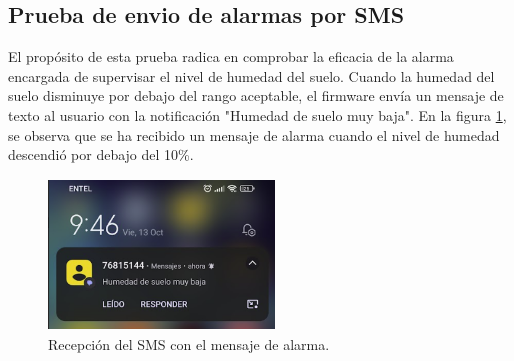 \subsection{Prueba de envio de alarmas por SMS}
El propósito de esta prueba radica en comprobar la eficacia de la alarma encargada de supervisar el nivel de humedad del suelo. Cuando la humedad del suelo disminuye por debajo del rango aceptable, el firmware envía un mensaje de texto al usuario con la notificación "Humedad de suelo muy baja". En la figura \ref{fig:sms alarma}, se observa que se ha recibido un mensaje de alarma cuando el nivel de humedad descendió por debajo del 10\%.

\begin{figure}[h!]
  \centering
    \includegraphics[width=6cm, height=4cm]{./Figures/sms_alarma2.png}
  \caption{Recepción del SMS con el mensaje  de alarma.}
    \label{fig:sms alarma}
\end{figure}

\label{sec:pruebasHW}


